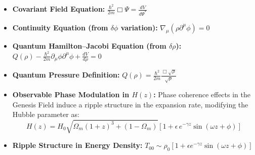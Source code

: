 \begin{tcolorbox}[colback=gray!7, colframe=black, title=\textbf{Summary of Key Derived Relations}, sharp corners=south]
\begin{itemize}
    \item \textbf{Covariant Field Equation:}  
    \quad $\displaystyle \frac{\hbar^2}{2m} \Box \Psi = \frac{dV}{d\Psi^*}$
    
    \item \textbf{Continuity Equation (from $\delta\phi$ variation):}  
    \quad $\displaystyle \nabla_\mu(\rho \partial^\mu \phi) = 0$

    \item \textbf{Quantum Hamilton–Jacobi Equation (from $\delta\rho$):}  
    \quad $\displaystyle Q(\rho) - \frac{\hbar^2}{2m} \partial_\mu \phi \partial^\mu \phi + \frac{dV}{d\rho} = 0$
    
    \item \textbf{Quantum Pressure Definition:}  
    \quad $\displaystyle Q(\rho) = \frac{\hbar^2}{2m} \frac{\Box \sqrt{\rho}}{\sqrt{\rho}}$

    \item \textbf{Observable Phase Modulation in $H(z)$:}  
    Phase coherence effects in the Genesis Field induce a ripple structure in the expansion rate, modifying the Hubble parameter as:
    \begin{equation}
    H(z) = H_0 \sqrt{ \Omega_m (1+z)^3 + (1 - \Omega_m) }
    \left[ 1 + \epsilon\, e^{-\gamma z} \sin(\omega z + \phi) \right]
    \end{equation}

    \item \textbf{Ripple Structure in Energy Density:}  
    \quad $\displaystyle T_{00} \sim \rho_0 \left[ 1 + \epsilon e^{-\gamma z} \sin(\omega z + \phi) \right]$
\end{itemize}
\end{tcolorbox}
